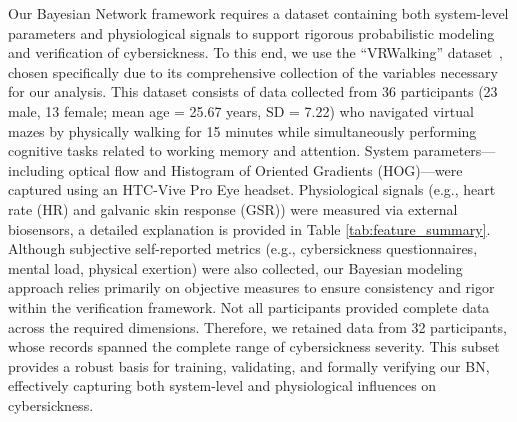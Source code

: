 \documentclass{vgtc}                          %
\begin{document}
Our Bayesian Network framework requires a dataset containing both system-level parameters and physiological signals to support rigorous probabilistic modeling and verification of cybersickness. To this end, we use the “VRWalking” dataset~\cite{setu2024mazedconfuseddatasetcybersickness}, chosen specifically due to its comprehensive collection of the variables necessary for our analysis. This dataset consists of data collected from 36 participants (23 male, 13 female; mean age = 25.67 years, SD = 7.22) who navigated virtual mazes by physically walking for 15 minutes while simultaneously performing cognitive tasks related to working memory and attention. System parameters—including optical flow and Histogram of Oriented Gradients (HOG)—were captured using an HTC-Vive Pro Eye headset. Physiological signals (e.g., heart rate (HR) and galvanic skin response (GSR)) were measured via external biosensors, a detailed explanation is provided in Table \ref{tab:feature_summary}. Although subjective self-reported metrics (e.g., cybersickness questionnaires, mental load, physical exertion) were also collected, our Bayesian modeling approach relies primarily on objective measures to ensure consistency and rigor within the verification framework. Not all participants provided complete data across the required dimensions. Therefore, we retained data from 32 participants, whose records spanned the complete range of cybersickness severity. This subset provides a robust basis for training, validating, and formally verifying our BN, effectively capturing both system-level and physiological influences on cybersickness.





\end{document}
